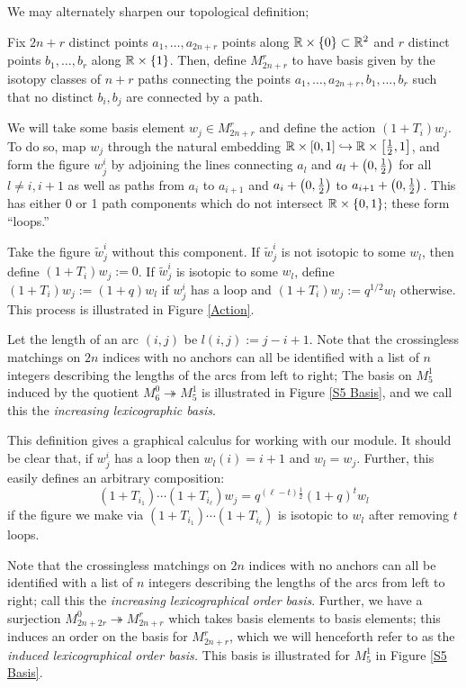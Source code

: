 \documentclass{amsart}
\begin{document}
We may alternately sharpen our topological definition;
\begin{definition}
Fix $2n + r$ distinct points $a_1,\dots,a_{2n + r}$ points along $\mathbb{R} \times \left\{ 0 \right\} \subset \mathbb{R}^2$ and $r$ distinct points $b_1,\dots,b_r$ along $\mathbb{R} \times \left\{ 1 \right\}$.
Then, define $M_{2n + r}^r$ to have basis given by the isotopy classes of $n + r$ paths connecting the points $a_1,\dots,a_{2n+r},b_1,\dots,b_r$ such that no distinct $b_i,b_j$ are connected by a path. 

We will take some basis element $w_j \in M_{2n +r}^r$ and define the action $(1 + T_i)w_j$.
To do so, map $w_j$ through the natural embedding $\mathbb{R} \times \left[ 0,1 \right] \hookrightarrow \mathbb{R} \times \left[ \frac{1}{2},1 \right]$, and form the figure $w_j^i$ by adjoining the lines connecting $a_l$ and $a_l + \left( 0,\frac{1}{2} \right)$ for all $l \neq i,i+1$ as well as paths from $a_i$ to $a_{i+1}$ and $a_i + \left( 0,\frac{1}{2} \right)$ to $a_{i+1} + \left( 0,\frac{1}{2} \right)$.
This has either 0 or 1 path components which do not intersect $\mathbb{R} \times \left\{ 0,1 \right\}$;
these form ``loops.''

Take the figure $\tilde w_j^i$ without this component.
If $\tilde w_j^i$ is not isotopic to some $w_l$, then define $(1 + T_i)w_j := 0$.
If $\tilde w_j^i$ is isotopic to some $w_l$, define $(1 + T_i)w_j := (1 + q)w_l$ if $w_j^i$ has a loop and $(1 + T_i)w_j := q^{1/2}w_l$ otherwise.
This process is illustrated in Figure \ref{Action}.
\end{definition}
  
Let the length of an arc $(i,j)$ be $l(i,j) := j - i + 1$.
Note that the crossingless matchings on $2n$ indices with no anchors can all be identified with a list of $n$ integers describing the lengths of the arcs from left to right;
The basis on $M_5^1$ induced by the quotient $M_6^0 \twoheadrightarrow M_{5}^1$ is illustrated in Figure \ref{S5 Basis}, and we call this the \emph{increasing lexicographic basis}. 

\begin{remark}
  This definition gives a graphical calculus for working with our module.
  It should be clear that, if $w_j^i$ has a loop then $w_l(i) = i+1$ and $w_l = w_j$.
  Further, this easily defines an arbitrary composition:
  \[
    (1 + T_{i_1})\cdots(1 + T_{i_\ell})w_j = q^{(\ell - t)\frac{1}{2}}(1 + q)^tw_l
  \]
  if the figure we make via $(1+T_{i_1})\cdots(1+T_{i_\ell})$ is isotopic to $w_l$ after removing $t$ loops.
\end{remark}
  
  Note that the crossingless matchings on $2n$ indices with no anchors can all be identified with a list of $n$ integers describing the lengths of the arcs from left to right;
  call this the \emph{increasing lexicographical order basis}.
  Further, we have a surjection $M_{2n + 2r}^0 \twoheadrightarrow M_{2n + r}^r$ which takes basis elements to basis elements;
  this induces an order on the basis for $M_{2n +r}^r$, which we will henceforth refer to as the \emph{induced lexicographical order basis.}
  This basis is illustrated for $M_{5}^1$ in Figure \ref{S5 Basis}. 
\end{document}
